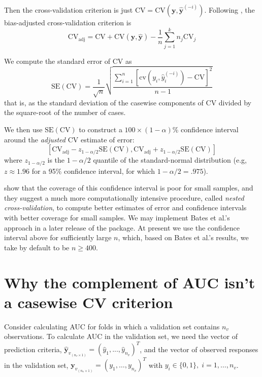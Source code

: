 \documentclass[
]{jss}
\begin{document}
Then the cross-validation criterion is just
\(\mathrm{CV} = \mathrm{CV}(\mathbf{y}, \widehat{\mathbf{y}}^{(-i)})\).
Following \citet[pp.~293--295]{DavisonHinkley:1997}, the bias-adjusted
cross-validation criterion is \[
\mathrm{CV}_{\mathrm{adj}} = \mathrm{CV} + \mathrm{CV}(\mathbf{y}, \widehat{\mathbf{y}}) - \frac{1}{n} \sum_{j=1}^{k} n_j \mathrm{CV}_j
\]

We compute the standard error of CV as \[
\mathrm{SE}(\mathrm{CV}) = \frac{1}{\sqrt n} \sqrt{ \frac{\sum_{i=1}^n \left[ \mathrm{cv}(y_i, \widehat{y}_i^{(-i)} ) - \mathrm{CV} \right]^2 }{n - 1} }
\] that is, as the standard deviation of the casewise components of CV
divided by the square-root of the number of cases.

We then use \(\mathrm{SE}(\mathrm{CV})\) to construct a
\(100 \times (1 - \alpha)\)\% confidence interval around the
\emph{adjusted} CV estimate of error: \[
\left[ \mathrm{CV}_{\mathrm{adj}} - z_{1 - \alpha/2}\mathrm{SE}(\mathrm{CV}), \mathrm{CV}_{\mathrm{adj}} + z_{1 - \alpha/2}\mathrm{SE}(\mathrm{CV})  \right]
\] where \(z_{1 - \alpha/2}\) is the \(1 - \alpha/2\) quantile of the
standard-normal distribution (e.g, \(z \approx 1.96\) for a 95\%
confidence interval, for which \(1 - \alpha/2 = .975\)).

\citet{BatesHastieTibshirani:2023} show that the coverage of this
confidence interval is poor for small samples, and they suggest a much
more computationally intensive procedure, called \emph{nested
cross-validation}, to compute better estimates of error and confidence
intervals with better coverage for small samples. We may implement Bates
et al.'s approach in a later release of the  package. At present
we use the confidence interval above for sufficiently large \(n\),
which, based on Bates et al.'s results, we take by default to be
\(n \ge 400\).

\hypertarget{why-the-complement-of-auc-isnt-a-casewise-cv-criterion}{%
\section{Why the complement of AUC isn't a casewise CV
criterion}\label{why-the-complement-of-auc-isnt-a-casewise-cv-criterion}}

Consider calculating AUC for folds in which a validation set contains
\(n_v\) observations. To calculate AUC in the validation set, we need
the vector of prediction criteria,
\(\widehat{\mathbf{y}}_{v_{(n_v \times 1)}} = (\widehat{y}_1, ..., \widehat{y}_{n_v})^T\),
and the vector of observed responses in the validation set,
\(\mathbf{y}_{v_{(n_v \times 1)}} = (y_1, \ldots, y_{n_v})^T\) with
\(y_i \in \{0,1\}, \; i = 1, \ldots, n_v\).
\end{document}

